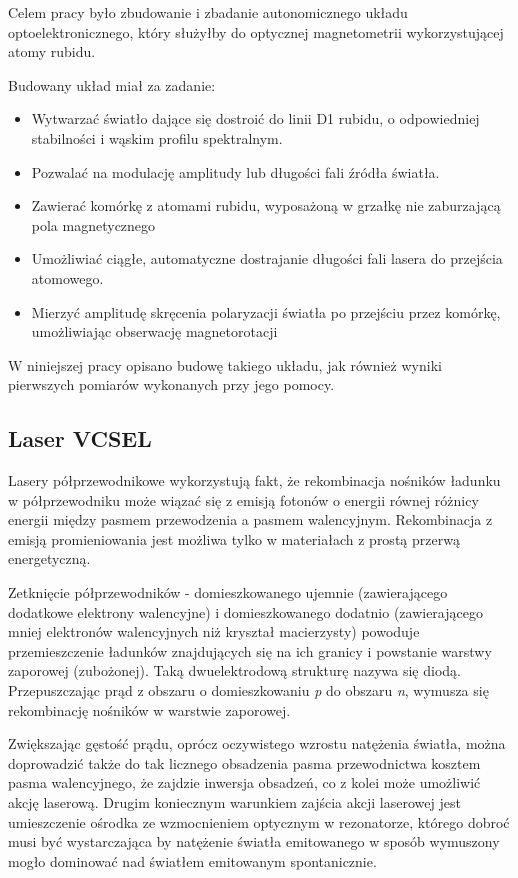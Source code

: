 \documentclass[a4paper,10pt]{article}
\begin{document}
Celem pracy było zbudowanie i zbadanie autonomicznego układu optoelektronicznego, który służyłby do optycznej magnetometrii wykorzystującej atomy rubidu.

Budowany układ miał za zadanie:
\begin{itemize}
 \item Wytwarzać światło dające się dostroić do linii D1 rubidu, o odpowiedniej stabilności i wąskim profilu spektralnym.
 \item Pozwalać na modulację amplitudy lub długości fali źródła światła.
 \item Zawierać komórkę z atomami rubidu, wyposażoną w grzałkę nie zaburzającą pola magnetycznego
 \item Umożliwiać ciągłe, automatyczne dostrajanie długości fali lasera do przejścia atomowego. 
 \item Mierzyć amplitudę skręcenia polaryzacji światła po przejściu przez komórkę, umożliwiając obserwację magnetorotacji
\end{itemize}

W niniejszej pracy opisano budowę takiego układu, jak również wyniki pierwszych pomiarów wykonanych przy jego pomocy.


\subsection{Laser VCSEL}


Lasery półprzewodnikowe wykorzystują fakt, że rekombinacja nośników ładunku w półprzewodniku może wiązać się z emisją fotonów o energii równej różnicy energii między pasmem przewodzenia a pasmem walencyjnym. Rekombinacja z emisją promieniowania jest możliwa tylko w materiałach z prostą przerwą energetyczną.


Zetknięcie półprzewodników - domieszkowanego ujemnie (zawierającego dodatkowe elektrony walencyjne) i domieszkowanego dodatnio (zawierającego mniej elektronów walencyjnych niż kryształ macierzysty) powoduje przemieszczenie ładunków znajdujących się na ich granicy i powstanie warstwy zaporowej (zubożonej). Taką dwuelektrodową strukturę nazywa się diodą. Przepuszczając prąd z obszaru o domieszkowaniu \textit{p} do obszaru \textit{n}, wymusza się rekombinację nośników w warstwie zaporowej.  

Zwiększając gęstość prądu, oprócz oczywistego wzrostu natężenia światła, można doprowadzić także do tak licznego obsadzenia pasma przewodnictwa kosztem pasma walencyjnego, że zajdzie inwersja obsadzeń, co z kolei może umożliwić akcję laserową. Drugim koniecznym warunkiem zajścia akcji laserowej jest umieszczenie ośrodka ze wzmocnieniem optycznym w rezonatorze, którego dobroć musi być wystarczająca by natężenie światła emitowanego w sposób wymuszony mogło dominować nad światłem emitowanym spontanicznie.
\end{document}
